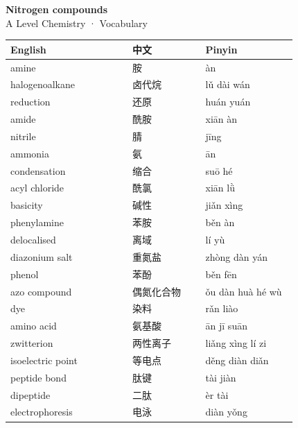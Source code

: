 \documentclass[11pt]{article}
\begin{document}
\begin{center}
  {\LARGE\bfseries Nitrogen compounds}\\[0.35em]
  {\large A Level Chemistry · Vocabulary}
\end{center}
\vspace{0.6em}

\begin{longtable}{@{}p{0.40\linewidth}p{0.24\linewidth}p{0.30\linewidth}@{}}
\toprule
\textbf{English} & \textbf{中文} & \textbf{Pinyin} \\
\midrule
\endhead
\bottomrule
\endlastfoot
amine & 胺 & àn \\
halogenoalkane & 卤代烷 & lǔ dài wán \\
reduction & 还原 & huán yuán \\
amide & 酰胺 & xiān àn \\
nitrile & 腈 & jīng \\
ammonia & 氨 & ān \\
condensation & 缩合 & suō hé \\
acyl chloride & 酰氯 & xiān lǜ \\
basicity & 碱性 & jiǎn xìng \\
phenylamine & 苯胺 & běn àn \\
delocalised & 离域 & lí yù \\
diazonium salt & 重氮盐 & zhòng dàn yán \\
phenol & 苯酚 & běn fēn \\
azo compound & 偶氮化合物 & ǒu dàn huà hé wù \\
dye & 染料 & rǎn liào \\
amino acid & 氨基酸 & ān jī suān \\
zwitterion & 两性离子 & liǎng xìng lí zi \\
isoelectric point & 等电点 & děng diàn diǎn \\
peptide bond & 肽键 & tài jiàn \\
dipeptide & 二肽 & èr tài \\
electrophoresis & 电泳 & diàn yǒng \\
\end{longtable}
\end{document}
